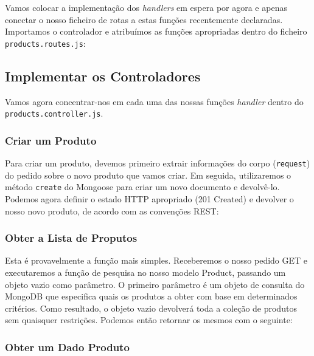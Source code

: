 Vamos colocar a implementação dos \textit{handlers} em espera por agora e apenas conectar o nosso ficheiro de rotas a estas funções recentemente declaradas. Importamos o controlador e atribuímos as funções apropriadas dentro do ficheiro \texttt{products.routes.js}:



\subsection{Implementar os Controladores}

Vamos agora concentrar-nos em cada uma das nossas funções \textit{handler} dentro do \texttt{products.controller.js}.

\subsubsection{Criar um Produto}

Para criar um produto, devemos primeiro extrair informações do corpo (\texttt{request}) do pedido sobre o novo produto que vamos criar. Em seguida, utilizaremos o método \texttt{create} do Mongoose para criar um novo documento e devolvê-lo. Podemos agora definir o estado HTTP apropriado (201 Created) e devolver o nosso novo produto, de acordo com as convenções REST:



\subsubsection{Obter a Lista de Proputos}

Esta é provavelmente a função mais simples. Receberemos o nosso pedido GET e executaremos a função de pesquisa no nosso modelo Product, passando um objeto vazio como parâmetro. O primeiro parâmetro é um objeto de consulta do MongoDB que especifica quais os produtos a obter com base em determinados critérios. Como resultado, o objeto vazio devolverá toda a coleção de produtos sem quaisquer restrições. Podemos então retornar os mesmos com o seguinte:



\subsubsection{Obter um Dado Produto}

